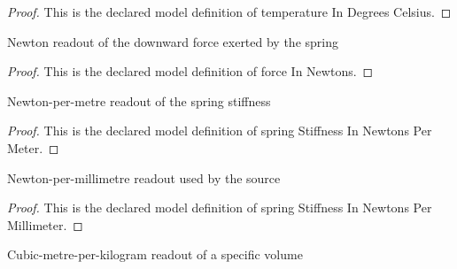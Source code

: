 \begin{proof}
  This is the declared model definition of temperature In Degrees Celsius.
\end{proof}
\begin{definition}
  \label{def:physics:phyx-mini-0446:phyxminiproblems-problemphyxmini0446-forceinnewtons}
  Newton readout of the downward force exerted by the spring
\end{definition}
\begin{proof}
  This is the declared model definition of force In Newtons.
\end{proof}
\begin{definition}
  \label{def:physics:phyx-mini-0446:phyxminiproblems-problemphyxmini0446-springstiffnessinnewtonspermeter}
  Newton-per-metre readout of the spring stiffness
\end{definition}
\begin{proof}
  This is the declared model definition of spring Stiffness In Newtons Per Meter.
\end{proof}
\begin{definition}
  \label{def:physics:phyx-mini-0446:phyxminiproblems-problemphyxmini0446-springstiffnessinnewtonspermillimeter}
  Newton-per-millimetre readout used by the source
\end{definition}
\begin{proof}
  This is the declared model definition of spring Stiffness In Newtons Per Millimeter.
\end{proof}
\begin{definition}
  \label{def:physics:phyx-mini-0446:phyxminiproblems-problemphyxmini0446-specificvolumeincubicmetersperkilogram}
  Cubic-metre-per-kilogram readout of a specific volume
\end{definition}
